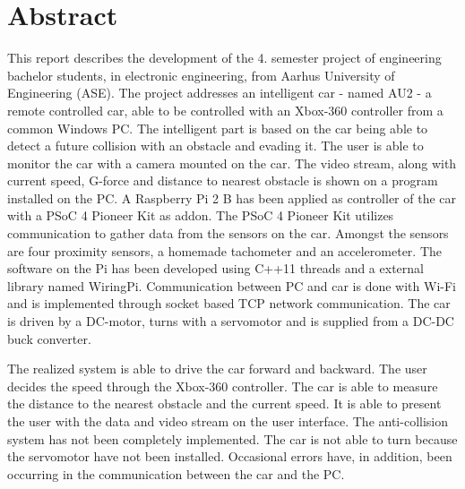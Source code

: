 \chapter{Abstract}
\label{ch:Abstract}

This report describes the development of the 4. semester project of engineering bachelor students, in electronic engineering, from Aarhus University of Engineering (ASE).
The project addresses an intelligent car - named AU2 - a remote controlled car, able to be controlled with an Xbox-360 controller\cite{lib:xbox-360} from a common Windows PC.
The intelligent part is based on the car being able to detect a future collision with an obstacle and evading it.
The user is able to monitor the car with a camera\cite{lib:cam} mounted on the car.
The video stream, along with current speed, G-force and distance to nearest obstacle is shown on a program installed on the PC.
A Raspberry Pi 2 B has been applied as controller of the car with a PSoC 4 Pioneer Kit\cite{lib:psoc4_guide} as addon. The PSoC 4 Pioneer Kit utilizes \IIC communication to gather data from the sensors on the car. Amongst the sensors are four proximity sensors\cite{lib:maxsonar}, a homemade tachometer and an accelerometer\cite{lib:accel}.
The software on the Pi has been developed using C++11 threads and a external \IIC library named WiringPi\cite{lib:wiringpi}.
Communication between PC and car is done with Wi-Fi and is implemented through socket based TCP network communication.
The car is driven by a DC-motor, turns with a servomotor and is supplied from a DC-DC buck converter.

The realized system is able to drive the car forward and backward. The user decides the speed through the Xbox-360 controller. The car is able to measure the distance to the nearest obstacle and the current speed. It is able to present the user with the data and video stream on the user interface. The anti-collision system has not been completely implemented. The car is not able to turn because the servomotor have not been installed. Occasional errors have, in addition, been occurring in the communication between the car and the PC.

\clearpage